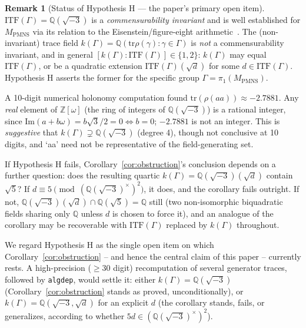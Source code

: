 \documentclass[12pt]{article}
\theoremstyle{definition}
\newtheorem{remark}[theorem]{Remark}
\newcommand{\Z}{\mathbb{Z}}
\newcommand{\Q}{\mathbb{Q}}
\newcommand{\tr}{\mathrm{tr}}
\newcommand{\ITF}{\mathrm{ITF}}
\begin{document}
\begin{remark}[Status of Hypothesis H --- the paper's primary open item]
\label{rem:hypothesis}
$\ITF(\Gamma)=\Q(\sqrt{-3})$ is a \emph{commensurability invariant} and
is well established for $M_{\mathrm{PMNS}}$ via its relation to the
Eisenstein/figure-eight arithmetic~\cite{maclachlan-reid}. The
(non-invariant) trace field $k(\Gamma)=\Q(\tr\rho(\gamma):\gamma\in\Gamma)$
is \emph{not} a commensurability invariant, and in general
$[k(\Gamma):\ITF(\Gamma)]\in\{1,2\}$: $k(\Gamma)$ may equal $\ITF(\Gamma)$,
or be a quadratic extension $\ITF(\Gamma)(\sqrt{d})$ for some
$d\in\ITF(\Gamma)$. Hypothesis H asserts the former for the specific
group $\Gamma=\pi_1(M_{\mathrm{PMNS}})$.

A 10-digit numerical holonomy computation found
$\tr(\rho(aa))\approx-2.7881$. Any \emph{real} element of $\Z[\omega]$
(the ring of integers of $\Q(\sqrt{-3})$) is a rational integer, since
$\mathrm{Im}(a+b\omega)=b\sqrt3/2=0\iff b=0$; $-2.7881$ is not an
integer. This is \emph{suggestive} that $k(\Gamma)\supsetneq\Q(\sqrt{-3})$
(degree 4), though not conclusive at 10 digits, and `aa' need not be
representative of the field-generating set.

If Hypothesis H fails, Corollary~\ref{cor:obstruction}'s conclusion
depends on a further question: does the resulting quartic
$k(\Gamma)=\Q(\sqrt{-3})(\sqrt{d})$ contain $\sqrt5$? If
$d\equiv5\pmod{(\Q(\sqrt{-3})^\times)^2}$, it does, and the corollary
fails outright. If not,
$\Q(\sqrt{-3})(\sqrt{d})\cap\Q(\sqrt5)=\Q$
still (two non-isomorphic biquadratic fields sharing only $\Q$ unless
$d$ is chosen to force it), and an analogue of the corollary may be
recoverable with $\ITF(\Gamma)$ replaced by $k(\Gamma)$ throughout.

We regard Hypothesis H as the single open item on which
Corollary~\ref{cor:obstruction} -- and hence the central claim of this
paper -- currently rests. A high-precision ($\geq30$ digit)
recomputation of several generator traces, followed by
\texttt{algdep}, would settle it: either $k(\Gamma)=\Q(\sqrt{-3})$
(Corollary~\ref{cor:obstruction} stands as proved, unconditionally),
or $k(\Gamma)=\Q(\sqrt{-3},\sqrt{d})$ for an explicit $d$ (the
corollary stands, fails, or generalizes, according to whether
$5d\in(\Q(\sqrt{-3})^\times)^2$).
\end{remark}
\end{document}
